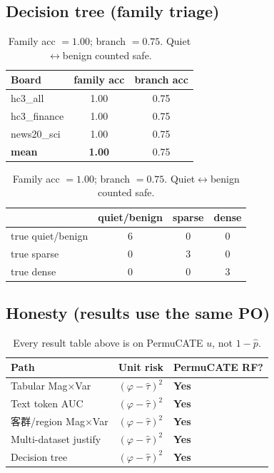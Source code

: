 \documentclass[11pt]{article}
\begin{document}
\subsection{Decision tree (family triage)}
\begin{table}[h]
\centering
\caption{Family acc $=1.00$; branch $=0.75$. Quiet$\leftrightarrow$benign counted safe.}
\label{tab:tree}
\small
\begin{tabular}{@{}lcc@{}}
\toprule
Board & family acc & branch acc \\
\midrule
hc3\_all & 1.00 & 0.75 \\
hc3\_finance & 1.00 & 0.75 \\
news20\_sci & 1.00 & 0.75 \\
\midrule
\textbf{mean} & \textbf{1.00} & 0.75 \\
\bottomrule
\end{tabular}
\qquad
\begin{tabular}{@{}lccc@{}}
\toprule
 & quiet/benign & sparse & dense \\
\midrule
true quiet/benign & 6 & 0 & 0 \\
true sparse & 0 & 3 & 0 \\
true dense & 0 & 0 & 3 \\
\bottomrule
\end{tabular}
\end{table}

\subsection{Honesty (results use the same PO)}
\begin{table}[h]
\centering
\caption{Every result table above is on PermuCATE $u$, not $1-\hat p$.}
\label{tab:honest}
\small
\begin{tabular}{@{}lll@{}}
\toprule
Path & Unit risk & PermuCATE RF? \\
\midrule
Tabular Mag$\times$Var & $(\varphi-\hat\tau)^2$ & \textbf{Yes} \\
Text token AUC & $(\varphi-\hat\tau)^2$ & \textbf{Yes} \\
客群/region Mag$\times$Var & $(\varphi-\hat\tau)^2$ & \textbf{Yes} \\
Multi-dataset justify & $(\varphi-\hat\tau)^2$ & \textbf{Yes} \\
Decision tree & $(\varphi-\hat\tau)^2$ & \textbf{Yes} \\
\bottomrule
\end{tabular}
\end{table}
\end{document}
